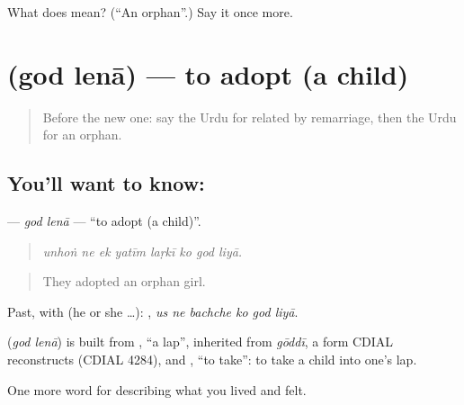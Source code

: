 \begin{tcolorbox}[breakable,colback=teal!4,colframe=teal!35!black,title={Before you move on}]
What does  mean? (\textquotedblleft{}An orphan\textquotedblright{}.) Say it once more.
\end{tcolorbox}
\section[\texorpdfstring{\ur{گود} \ur{لینا} (god lenā)}{گود لینا (god lenā)}]{  (god lenā) — to adopt (a child)}

\label{lesson:UR-C490-god-lena}



\begin{quote}
Before the new one: say the Urdu for related by remarriage, then the Urdu for an orphan.
\end{quote}

\subsection*{You'll want to know:  }
\textbf{ } — \emph{god lenā} — \textquotedblleft{}to adopt (a child)\textquotedblright{}.

\begin{quote}
       
\end{quote}

\begin{quote}
\emph{unhoṅ ne ek yatīm laṛkī ko god liyā.}
\end{quote}

\begin{quote}
They adopted an orphan girl.
\end{quote}

Past, with  (he or she …):      , \emph{us ne bachche ko god liyā}.

\begin{cousinweb}
\textbf{ } (\emph{god lenā}) is built from \textbf{}, \textquotedblleft{}a lap\textquotedblright{}, inherited from \emph{gōddī}, a form CDIAL reconstructs (CDIAL 4284), and \textbf{}, \textquotedblleft{}to take\textquotedblright{}: to take a child into one's lap.
\end{cousinweb}

\begin{grammarlens}[title={What you've built}]
One more word for describing what you lived and felt.
\end{grammarlens}

